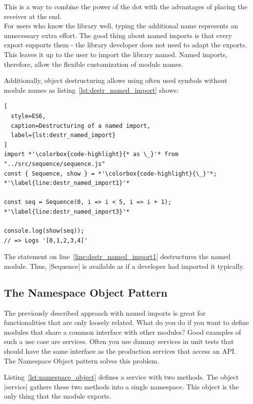 This is a way to combine the power of the dot with the advantages of placing
the receiver at the end. \\
For users who know the library well, typing the additional name represents an
unnecessary extra effort. The good thing about named imports is that every
export supports them - the library developer does not need to adapt the
exports. \\
This leaves it up to the user to import the library named. Named
imports, therefore, allow the flexible customization of module names.

Additionally, object destructuring allows using often used symbols without
module names as listing~\ref{lst:destr_named_import} shows:

\begin{lstlisting}[
  style=ES6,
  caption=Destructuring of a named import,
  label={lst:destr_named_import}
]
import *'\colorbox{code-highlight}{* as \_}'* from "../src/sequence/sequence.js" 
const { Sequence, show } = *'\colorbox{code-highlight}{\_}'*; *'\label{line:destr_named_import1}'*

const seq = Sequence(0, i => i < 5, i => i + 1); *'\label{line:destr_named_import3}'*

console.log(show(seq));
// => Logs '[0,1,2,3,4]'
\end{lstlisting}

The statement on line~\ref{line:destr_named_import1} destructures the named
module. Thus, |Sequence| is available as if a developer had imported it
typically.


\subsection{The Namespace Object Pattern} %
\label{sub:The Namespace Object Pattern}
The previously described approach with named imports is great for
functionalities that are only loosely related. What do you do if you want to
define modules that share a common interface with other modules? Good examples
of such a use case are services. Often you use dummy services in unit tests
that should have the same interface as the production services that access an
API. The Namespace Object pattern solves this problem.

Listing~\ref{lst:namespace_object} defines a service with two methods. The
object |service| gathers these two methods into a single namespace. This object
is the only thing that the module exports.

